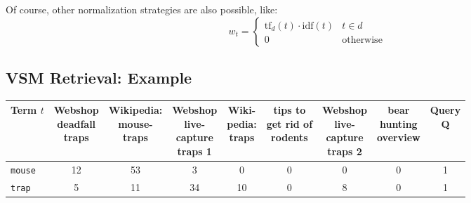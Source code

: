 				Of course, other normalization strategies are also possible, like:
				\begin{equation*}
					w_t =
					\begin{cases}
						\text{tf}_d(t) \cdot \text{idf}(t) & t \in d          \\
						0                                  & \text{otherwise}
					\end{cases}
				\end{equation*}

		\subsection{VSM Retrieval: Example} %
			\begin{table}[H]
				\centering
				\begin{tabular}{|l|c|c|c|c|c|c|c||c|}
					\hline
					\textbf{Term} \(t\)    & \makecell{Webshop \\ deadfall \\ traps} & \makecell{Wikipedia: \\ mouse- \\ traps} & \makecell{Webshop \\ live- \\ capture \\ traps 1} & \makecell{Wiki- \\ pedia: \\ traps} & \makecell{tips to \\ get rid of \\ rodents} & \makecell{Webshop \\ live- \\ capture \\ traps 2} & \makecell{bear \\ hunting \\ overview} & \makecell{Query \\ Q} \\ \hline
					\texttt{mouse}         & 12                                      & 53                                       & 3                                                 & \textcolor{irl}{0}                  & \textcolor{irl}{0}                          & \textcolor{irl}{0}                                & \textcolor{irl}{0}                     & 1                     \\ \hline
					\texttt{trap}          & 5                                       & 11                                       & 34                                                & 10                                  & \textcolor{irl}{0}                          & 8                                                 & \textcolor{irl}{0}                     & 1                     \\ \hline

\end{tabular}
\end{table}
